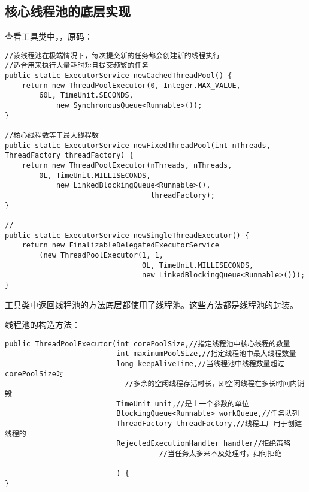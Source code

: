 \documentclass[a4paper]{report}
\begin{document}
\subsection{核心线程池的底层实现}
查看工具类中，，原码：

\begin{Verbatim}[frame=single,numbersep=5pt,xleftmargin=1.5em,xrightmargin=1.5em]
//该线程池在极端情况下，每次提交新的任务都会创建新的线程执行
//适合用来执行大量耗时短且提交频繁的任务
public static ExecutorService newCachedThreadPool() {
    return new ThreadPoolExecutor(0, Integer.MAX_VALUE,
        60L, TimeUnit.SECONDS,
            new SynchronousQueue<Runnable>());
}

//核心线程数等于最大线程数
public static ExecutorService newFixedThreadPool(int nThreads, ThreadFactory threadFactory) {
    return new ThreadPoolExecutor(nThreads, nThreads,
        0L, TimeUnit.MILLISECONDS,
            new LinkedBlockingQueue<Runnable>(),
                                  threadFactory);
}

//
public static ExecutorService newSingleThreadExecutor() {
    return new FinalizableDelegatedExecutorService
        (new ThreadPoolExecutor(1, 1,
                                0L, TimeUnit.MILLISECONDS,
                                new LinkedBlockingQueue<Runnable>()));
}

\end{Verbatim}

工具类中返回线程池的方法底层都使用了线程池。这些方法都是线程池的封装。

线程池的构造方法：

\begin{Verbatim}[frame=single,numbersep=5pt,xleftmargin=1.5em,xrightmargin=1.5em]
public ThreadPoolExecutor(int corePoolSize,//指定线程池中核心线程的数量
                          int maximumPoolSize,//指定线程池中最大线程数量
                          long keepAliveTime,//当线程池中线程数量超过corePoolSize时
                            //多余的空闲线程存活时长，即空闲线程在多长时间内销毁
                          TimeUnit unit,//是上一个参数的单位
                          BlockingQueue<Runnable> workQueue,//任务队列
                          ThreadFactory threadFactory,//线程工厂用于创建线程的
                          RejectedExecutionHandler handler//拒绝策略
                                    //当任务太多来不及处理时，如何拒绝

                          ) {
}\end{Verbatim}
\end{document}

